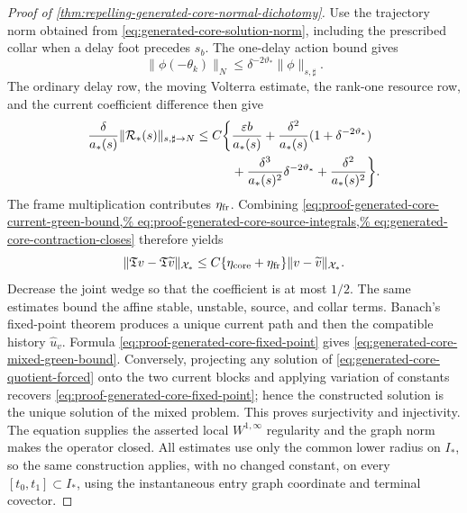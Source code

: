 \begin{proof}[Proof of
\cref{thm:repelling-generated-core-normal-dichotomy}]
Use the trajectory norm obtained from
\cref{eq:generated-core-solution-norm}, including the prescribed collar
when a delay foot precedes \(s_b\).  The one-delay action bound gives
\[
 \|\phi(-\theta_k)\|_N
 \le\delta^{-2\vartheta_*}\|\phi\|_{s,\sharp}.
\]
The ordinary delay row, the moving Volterra estimate, the rank-one
resource row, and the current coefficient difference then give
\begin{align}
 \frac{\delta}{a_*(s)}
 \|\mathcal R_*(s)\|_{s,\sharp\to N}
 \le C\biggl\{
 &\frac{\varepsilon b}{a_*(s)}
 +\frac{\delta^2}{a_*(s)}
       (1+\delta^{-2\vartheta_*})\notag\\
 &+\frac{\delta^3}{a_*(s)^2}\delta^{-2\vartheta_*}
 +\frac{\delta^2}{a_*(s)^2}\biggr\}.            \label{eq:proof-generated-core-remainder-number}
\end{align}
The frame multiplication contributes
\(\eta_{\rm fr}\).  Combining
\cref{eq:proof-generated-core-current-green-bound,%
eq:proof-generated-core-source-integrals,%
eq:generated-core-contraction-closes}
therefore yields
\begin{equation}
 \|\mathfrak Tv-\mathfrak T\widetilde v\|_{\mathcal X_*}
 \le C\{\eta_{\rm core}+\eta_{\rm fr}\}
       \|v-\widetilde v\|_{\mathcal X_*}.        \label{eq:proof-generated-core-contraction}
\end{equation}
Decrease the joint wedge so that the coefficient is at most \(1/2\).
The same estimates bound the affine stable, unstable, source, and collar
terms.  Banach's fixed-point theorem produces a unique current path and
then the compatible history
\(\widehat u_v\).  Formula
\cref{eq:proof-generated-core-fixed-point} gives
\cref{eq:generated-core-mixed-green-bound}.
Conversely, projecting any solution of
\cref{eq:generated-core-quotient-forced} onto the two current blocks and
applying variation of constants recovers
\cref{eq:proof-generated-core-fixed-point}; hence the constructed
solution is the unique solution of the mixed problem.  This proves
surjectivity and injectivity.  The equation supplies the asserted local
\(W^{1,\infty}\) regularity and the graph norm makes the operator closed.
All estimates use only the common lower radius on \(I_*\), so the same
construction applies, with no changed constant, on every
\([t_0,t_1]\subset I_*\), using the instantaneous entry graph coordinate
and terminal covector.


\end{proof}
